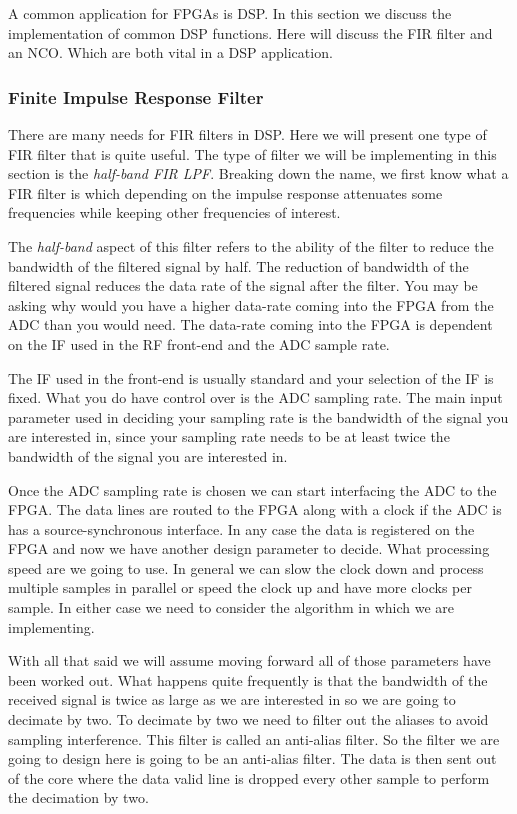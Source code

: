 A common application for \ac{FPGA}s is \ac{DSP}. In this section we discuss the implementation of common \ac{DSP} functions. Here will discuss the \ac{FIR} filter and an \ac{NCO}. Which are both vital in a \ac{DSP} application. 

\subsubsection{Finite Impulse Response Filter}
\label{sec:fir}

There are many needs for \ac{FIR} filters in \ac{DSP}. Here we will present one type of \ac{FIR} filter that is quite useful. The type of filter we will be implementing in this section is the \emph{half-band \ac{FIR} \ac{LPF}}. Breaking down the name, we first know what a \ac{FIR} filter is which depending on the impulse response attenuates some frequencies while keeping other frequencies of interest. 

The \emph{half-band} aspect of this filter refers to the ability of the filter to reduce the bandwidth of the filtered signal by half. The reduction of bandwidth of the filtered signal reduces the data rate of the signal after the filter. You may be asking why would you have a higher data-rate coming into the \ac{FPGA} from the \ac{ADC} than you would need. The data-rate coming into the \ac{FPGA} is dependent on the \ac{IF} used in the \ac{RF} front-end and the \ac{ADC} sample rate. 

The \ac{IF} used in the front-end is usually standard and your selection of the \ac{IF} is fixed. What you do have control over is the \ac{ADC} sampling rate. The main input parameter used in deciding your sampling rate is the bandwidth of the signal you are interested in, since your sampling rate needs to be at least twice the bandwidth of the signal you are interested in. 

Once the \ac{ADC} sampling rate is chosen we can start interfacing the \ac{ADC} to the \ac{FPGA}. The data lines are routed to the \ac{FPGA} along with a clock if the \ac{ADC} is has a source-synchronous interface. In any case the data is registered on the \ac{FPGA} and now we have another design parameter to decide. What processing speed are we going to use. In general we can slow the clock down and process multiple samples in parallel or speed the clock up and have more clocks per sample. In either case we need to consider the algorithm in which we are implementing. 

With all that said we will assume moving forward all of those parameters have been worked out. What happens quite frequently is that the bandwidth of the received signal is twice as large as we are interested in so we are going to decimate by two. To decimate by two we need to filter out the aliases to avoid sampling interference. This filter is called an anti-alias filter. So the filter we are going to design here is going to be an anti-alias filter. The data is then sent out of the core where the data valid line is dropped every other sample to perform the decimation by two. 


